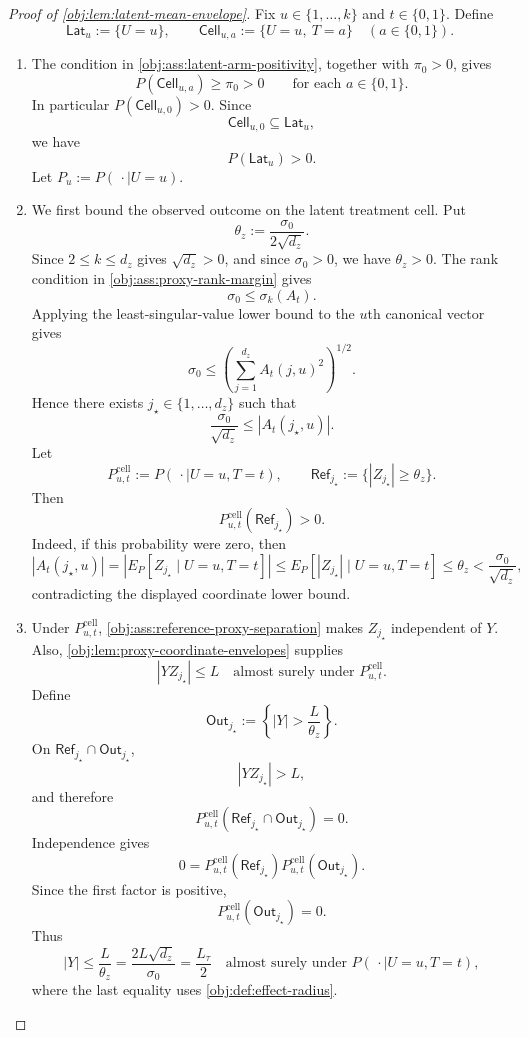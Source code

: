 \begin{proof}[Proof of \cref{obj:lem:latent-mean-envelope}]
Fix \(u\in\{1,\ldots,k\}\) and \(t\in\{0,1\}\). Define
\[
\mathsf{Lat}_u:=\{U=u\},
\qquad
\mathsf{Cell}_{u,a}:=\{U=u,\ T=a\}\quad(a\in\{0,1\}).
\]
\begin{enumerate}
\item The condition in \cref{obj:ass:latent-arm-positivity}, together with \(\pi_0>0\), gives
\[
P(\mathsf{Cell}_{u,a})\ge \pi_0>0
\qquad\text{for each }a\in\{0,1\}.
\]
In particular \(P(\mathsf{Cell}_{u,0})>0\). Since
\[
\mathsf{Cell}_{u,0}\subseteq \mathsf{Lat}_u,
\]
we have
\[
P(\mathsf{Lat}_u)>0 .
\]
Let \(P_u:=P(\,\cdot\mid U=u)\). %

\item We first bound the observed outcome on the latent treatment cell. Put
\[
\theta_z:=\frac{\sigma_0}{2\sqrt{d_z}}.
\]
Since \(2\le k\le d_z\) gives \(\sqrt{d_z}>0\), and since \(\sigma_0>0\), we have \(\theta_z>0\). The rank condition in \cref{obj:ass:proxy-rank-margin} gives
\[
\sigma_0\le \sigma_k(A_t).
\]
Applying the least-singular-value lower bound to the \(u\)th canonical vector gives
\[
\sigma_0
\le
\left(\sum_{j=1}^{d_z} A_t(j,u)^2\right)^{1/2}.
\]
Hence there exists \(j_\star\in\{1,\ldots,d_z\}\) such that
\[
\frac{\sigma_0}{\sqrt{d_z}}\le |A_t(j_\star,u)|.
\]
Let
\[
P_{u,t}^{\mathrm{cell}}:=P(\,\cdot\mid U=u,T=t),
\qquad
\mathsf{Ref}_{j_\star}:=\{|Z_{j_\star}|\ge \theta_z\}.
\]
Then
\[
P_{u,t}^{\mathrm{cell}}(\mathsf{Ref}_{j_\star})>0.
\]
Indeed, if this probability were zero, then
\[
|A_t(j_\star,u)|
=
\left|E_P[Z_{j_\star}\mid U=u,T=t]\right|
\le
E_P[|Z_{j_\star}|\mid U=u,T=t]
\le
\theta_z
<
\frac{\sigma_0}{\sqrt{d_z}},
\]
contradicting the displayed coordinate lower bound. %

\item Under \(P_{u,t}^{\mathrm{cell}}\), \cref{obj:ass:reference-proxy-separation} makes \(Z_{j_\star}\) independent of \(Y\). Also, \cref{obj:lem:proxy-coordinate-envelopes} supplies
\[
|Y Z_{j_\star}|\le L
\quad\text{almost surely under }P_{u,t}^{\mathrm{cell}}.
\]
Define
\[
\mathsf{Out}_{j_\star}
:=
\left\{|Y|>\frac{L}{\theta_z}\right\}.
\]
On \(\mathsf{Ref}_{j_\star}\cap\mathsf{Out}_{j_\star}\),
\[
|Y Z_{j_\star}|>L,
\]
and therefore
\[
P_{u,t}^{\mathrm{cell}}(\mathsf{Ref}_{j_\star}\cap\mathsf{Out}_{j_\star})=0.
\]
Independence gives
\[
0
=
P_{u,t}^{\mathrm{cell}}(\mathsf{Ref}_{j_\star})
P_{u,t}^{\mathrm{cell}}(\mathsf{Out}_{j_\star}).
\]
Since the first factor is positive,
\[
P_{u,t}^{\mathrm{cell}}(\mathsf{Out}_{j_\star})=0.
\]
Thus
\[
|Y|\le \frac{L}{\theta_z}
=
\frac{2L\sqrt{d_z}}{\sigma_0}
=
\frac{L_\tau}{2}
\quad\text{almost surely under }P(\,\cdot\mid U=u,T=t),
\]
where the last equality uses \cref{obj:def:effect-radius}. %


\end{enumerate}
\end{proof}
